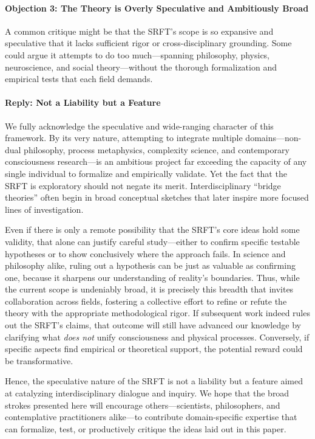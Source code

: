 \documentclass[12pt,a4paper]{article}
\begin{document}
\paragraph{Objection 3: The Theory is Overly Speculative and Ambitiously Broad}
A common critique might be that the SRFT’s scope is so expansive and speculative
that it lacks sufficient rigor or cross-disciplinary grounding. Some could argue
it attempts to do too much---spanning philosophy, physics, neuroscience, and
social theory---without the thorough formalization and empirical tests that each
field demands.

\paragraph{Reply: Not a Liability but a Feature}
We fully acknowledge the speculative and wide-ranging character of this framework.
By its very nature, attempting to integrate multiple domains---non-dual philosophy,
process metaphysics, complexity science, and contemporary consciousness research---is
an ambitious project far exceeding the capacity of any single individual to
formalize and empirically validate. Yet the fact that the SRFT is exploratory
should not negate its merit. Interdisciplinary “bridge theories” often begin in broad
conceptual sketches that later inspire more focused lines of investigation.

Even if there is only a remote possibility that the SRFT’s core ideas hold some
validity, that alone can justify careful study—either to confirm specific testable
hypotheses or to show conclusively where the approach fails. In science and
philosophy alike, ruling out a hypothesis can be just as valuable as confirming one,
because it sharpens our understanding of reality’s boundaries. Thus, while the current
scope is undeniably broad, it is precisely this breadth that invites collaboration
across fields, fostering a collective effort to refine or refute the theory with the
appropriate methodological rigor. If subsequent work indeed rules out the SRFT’s claims,
that outcome will still have advanced our knowledge by clarifying what \emph{does not}
unify consciousness and physical processes. Conversely, if specific aspects find
empirical or theoretical support, the potential reward could be transformative.

Hence, the speculative nature of the SRFT is not a liability but a feature aimed at
catalyzing interdisciplinary dialogue and inquiry. We hope that the broad strokes
presented here will encourage others---scientists, philosophers, and contemplative
practitioners alike---to contribute domain-specific expertise that can formalize,
test, or productively critique the ideas laid out in this paper.
\end{document}
